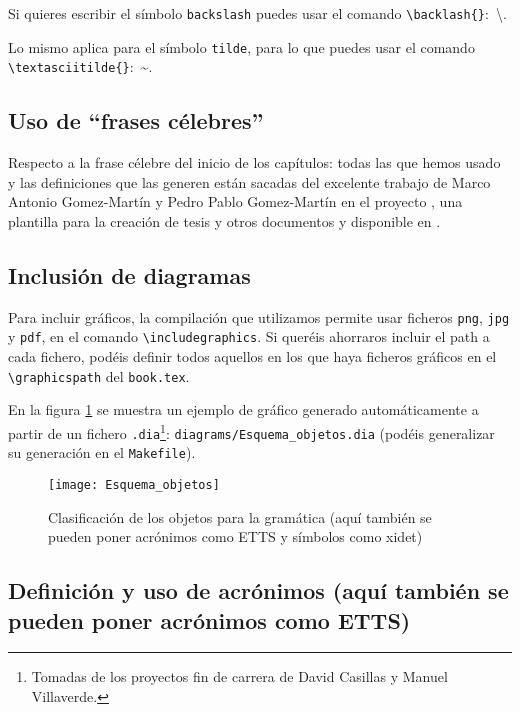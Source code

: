 Si quieres escribir el símbolo \texttt{backslash} puedes usar el comando
\texttt{\textbackslash{}backlash\{\}}:~\textbackslash{}.

Lo mismo aplica para el símbolo \texttt{tilde}, para lo que puedes usar
el comando \texttt{\textbackslash{}textasciitilde\{\}}:~\textasciitilde{}.


\subsection{Uso de ``frases célebres''}
\label{sec:uso-de-frases}

Respecto a la frase célebre del inicio de los capítulos: todas las que
hemos usado y las definiciones que las generen están sacadas del
excelente trabajo de Marco Antonio Gomez-Martín y Pedro Pablo
Gomez-Martín en el proyecto \texis, una plantilla para la creación de
tesis y otros documentos y disponible en \cite{texis}.


\subsection{Inclusión de diagramas}
\label{sec:diagrama}

Para incluir gráficos, la compilación que utilizamos permite usar
ficheros \texttt{png}, \texttt{jpg} y \texttt{pdf}, en el comando
\texttt{\textbackslash{}includegraphics}. Si queréis ahorraros incluir
el path a cada fichero, podéis definir todos aquellos en los que haya
ficheros gráficos en el \texttt{\textbackslash{}graphicspath} del
\texttt{book.tex}.

En la figura \ref{fig:fig_clobj} se muestra un ejemplo de gráfico
generado automáticamente a partir de un fichero
\texttt{.dia}\footnote{Tomadas de los proyectos fin de carrera de David
  Casillas y Manuel Villaverde.}: \texttt{diagrams/Esquema\_objetos.dia}
(podéis generalizar su generación en el \texttt{Makefile}).

\begin{figure}[tphb]
  \centering
  \texttt{[image: Esquema\_objetos]}
  \caption{Clasificación de los objetos para la gramática (aquí también
    se pueden poner acrónimos como \acs{ETTS} y símbolos como \ac{xidet})}
  \label{fig:fig_clobj}
\end{figure}


\subsection{Definición y uso de acrónimos (aquí también
    se pueden poner acrónimos como \acs{ETTS})}
\label{sec:uso-de-acronimos}

